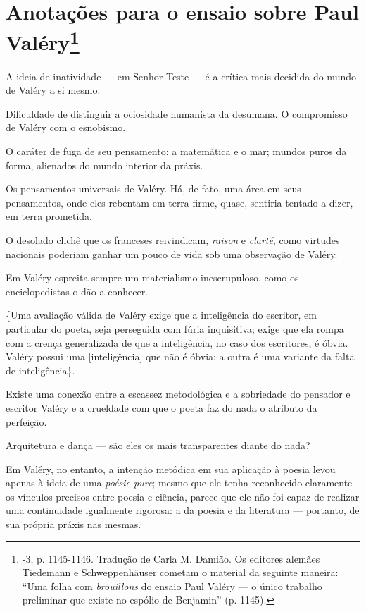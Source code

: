 \chapter{Anotações para o ensaio sobre Paul Valéry\footnote[*]{-3, p. 1145-1146. Tradução de Carla M. Damião. Os
  editores alemães Tiedemann e Schweppenhäuser cometam o material da
  seguinte maneira: ``Uma folha com \emph{brouillons} do ensaio Paul
  Valéry --- o único trabalho preliminar que existe no espólio de
  Benjamin'' (p. 1145).}}

A ideia de inatividade --- em Senhor Teste --- é a crítica mais decidida do
mundo de Valéry a si mesmo.

Dificuldade de distinguir a ociosidade humanista da desumana. O
compromisso de Valéry com o esnobismo.

O caráter de fuga de seu pensamento: a matemática e o mar; mundos puros
da forma, alienados do mundo interior da práxis.

Os pensamentos universais de Valéry. Há, de fato, uma área em seus
pensamentos, onde eles rebentam em terra firme, quase, sentiria tentado
a dizer, em terra prometida.

O desolado clichê que os franceses reivindicam, \emph{raison} e
\emph{clarté}, como virtudes nacionais poderiam ganhar um pouco de vida
sob uma observação de Valéry.

Em Valéry espreita sempre um materialismo inescrupuloso, como os
enciclopedistas o dão a conhecer.

\{Uma avaliação válida de Valéry exige que a inteligência do escritor,
em particular do poeta, seja perseguida com fúria inquisitiva; exige que
ela rompa com a crença generalizada de que a inteligência, no caso dos
escritores, é óbvia. Valéry possui uma {[}inteligência{]} que não é
óbvia; a outra é uma variante da falta de inteligência\}.

Existe uma conexão entre a escassez metodológica e a sobriedade do
pensador e escritor Valéry e a crueldade com que o poeta faz do nada o
atributo da perfeição.

Arquitetura e dança --- são eles os mais transparentes diante do nada?

Em Valéry, no entanto, a intenção metódica em sua aplicação à poesia
levou apenas à ideia de uma \emph{poésie pure}; mesmo que ele tenha
reconhecido claramente os vínculos precisos entre poesia e ciência,
parece que ele não foi capaz de realizar uma continuidade igualmente
rigorosa: a da poesia e da literatura --- portanto, de sua própria práxis
nas mesmas.

